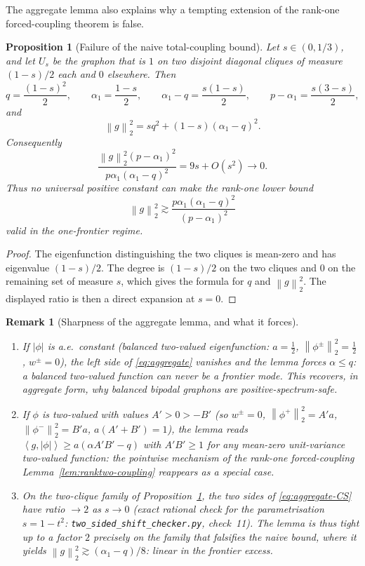 \documentclass[11pt]{article}
\newtheorem{proposition}[theorem]{Proposition}
\newtheorem{remark}[theorem]{Remark}
\newcommand{\ip}[2]{\left\langle #1,#2\right\rangle}
\newcommand{\norm}[1]{\left\|#1\right\|}
\begin{document}
The aggregate lemma also explains why a tempting extension of the rank-one forced-coupling theorem is false.

\begin{proposition}[Failure of the naive total-coupling bound]\label{prop:two-clique}
Let $s\in(0,1/3)$, and let $U_s$ be the graphon that is $1$ on two disjoint diagonal cliques of measure $(1-s)/2$ each and $0$ elsewhere.  Then
\[
        q=\frac{(1-s)^2}{2},
        \qquad
        \alpha_1=\frac{1-s}{2},
        \qquad
        \alpha_1-q=\frac{s(1-s)}2,
        \qquad
        p-\alpha_1=\frac{s(3-s)}2,
\]
and
\[
        \norm g_2^2=sq^2+(1-s)(\alpha_1-q)^2.
\]
Consequently
\[
        \frac{\norm g_2^2(p-\alpha_1)^2}{p\alpha_1(\alpha_1-q)^2}
        =9s+O(s^2)\to0.
\]
Thus no universal positive constant can make the rank-one lower bound
\[
        \norm g_2^2\gtrsim \frac{p\alpha_1(\alpha_1-q)^2}{(p-\alpha_1)^2}
\]
valid in the one-frontier regime.
\end{proposition}

\begin{proof}
The eigenfunction distinguishing the two cliques is mean-zero and has eigenvalue $(1-s)/2$.  The degree is $(1-s)/2$ on the two cliques and $0$ on the remaining set of measure $s$, which gives the formula for $q$ and $\norm g_2^2$.  The displayed ratio is then a direct expansion at $s=0$.
\end{proof}

\begin{remark}[Sharpness of the aggregate lemma, and what it forces]\label{rmk:agg-sharp}
\begin{enumerate}[label=\textup{(\alph*)}]
\item If $|\phi|$ is a.e.\ constant (balanced two-valued eigenfunction:
$a=\tfrac12$, $\norm{\phi^\pm}_2^2=\tfrac12$, $w^\pm=0$), the left side of
\eqref{eq:aggregate} vanishes and the lemma forces $\alpha\le q$: a balanced
two-valued function can never be a frontier mode.  This recovers, in
aggregate form, why balanced bipodal graphons are positive-spectrum-safe.
\item If $\phi$ is two-valued with values $A'>0>-B'$ (so $w^\pm=0$,
$\norm{\phi^+}_2^2=A'a$, $\norm{\phi^-}_2^2=B'a$, $a(A'+B')=1$), the lemma
reads $\ip{g}{|\phi|}\ge a(\alpha A'B'-q)$ with $A'B'\ge1$ for any mean-zero
unit-variance two-valued function: the pointwise mechanism of the rank-one
forced-coupling Lemma~\ref{lem:ranktwo-coupling} reappears as a special case.
\item On the two-clique family of Proposition~\ref{prop:two-clique}, the two
sides of \eqref{eq:aggregate-CS} have ratio $\to2$ as $s\to0$ (exact rational
check for the parametrisation $s=1-t^2$:
\texttt{two\_sided\_shift\_checker.py}, check~11).  The lemma is thus tight
up to a factor $2$ precisely on the family that falsifies the naive bound,
where it yields $\norm g_2^2\gtrsim(\alpha_1-q)/8$: \emph{linear} in the
frontier excess.
\end{enumerate}
\end{remark}
\end{document}
